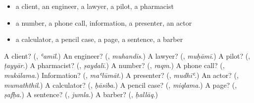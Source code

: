 \begin{itemize}
\raggedright
  \item a client, an engineer, a lawyer, a pilot, a pharmacist
  \item a number, a phone call, information, a presenter, an actor
  \item a calculator, a pencil case, a page, a sentence, a barber
\end{itemize}

\begin{tcolorbox}[breakable,colback=teal!4,colframe=teal!35!black,title={Before you move on}]
A client? (\textbf{}, \emph{ʿamīl}.) An engineer? (\textbf{}, \emph{muhandis}.) A lawyer? (\textbf{}, \emph{muḥāmī}.) A pilot? (\textbf{}, \emph{ṭayyār}.) A pharmacist? (\textbf{}, \emph{ṣaydalī}.) A number? (\textbf{}, \emph{raqm}.) A phone call? (\textbf{}, \emph{mukālama}.) Information? (\textbf{}, \emph{maʿlūmāt}.) A presenter? (\textbf{}, \emph{mudhīʿ}.) An actor? (\textbf{}, \emph{mumaththil}.) A calculator? (\textbf{}, \emph{ḥāsiba}.) A pencil case? (\textbf{}, \emph{miqlama}.) A page? (\textbf{}, \emph{ṣafḥa}.) A sentence? (\textbf{}, \emph{jumla}.) A barber? (\textbf{}, \emph{ḥallāq}.)
\end{tcolorbox}
